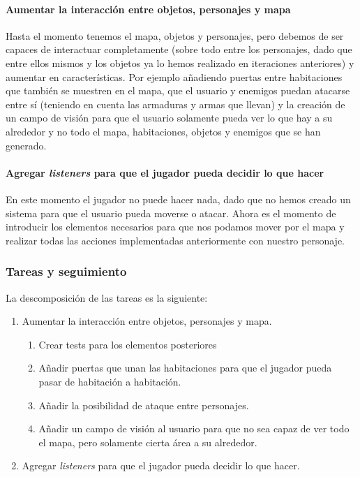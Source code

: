 \paragraph{Aumentar la interacción entre objetos, personajes y mapa} Hasta el momento tenemos el mapa, objetos y personajes, pero debemos de ser capaces de interactuar completamente (sobre todo entre los personajes, dado que entre ellos mismos y los objetos ya lo hemos realizado en iteraciones anteriores) y aumentar en características. Por ejemplo añadiendo puertas entre habitaciones que también se muestren en el mapa, que el usuario y enemigos puedan atacarse entre sí (teniendo en cuenta las armaduras y armas que llevan) y la creación de un campo de visión para que el usuario solamente pueda ver lo que hay a su alrededor y no todo el mapa, habitaciones, objetos y enemigos que se han generado.

\paragraph{Agregar \textit{listeners} para que el jugador pueda decidir lo que hacer} En este momento el jugador no puede hacer nada, dado que no hemos creado un sistema para que el usuario pueda moverse o atacar. Ahora es el momento de introducir los elementos necesarios para que nos podamos mover por el mapa y realizar todas las acciones implementadas anteriormente con nuestro personaje.

\subsubsection{Tareas y seguimiento}

La descomposición de las tareas es la siguiente:

\begin{enumerate}[label=\bfseries WBS 1.\arabic*]
  \item Aumentar la interacción entre objetos, personajes y mapa.
    \begin{enumerate}[label=\bfseries WBS 1.1.\arabic*]
      \item Crear tests para los elementos posteriores
      \item Añadir puertas que unan las habitaciones para que el jugador pueda pasar de habitación a habitación.
      \item Añadir la posibilidad de ataque entre personajes.
      \item Añadir un campo de visión al usuario para que no sea capaz de ver todo el mapa, pero solamente cierta área a su alrededor.
    \end{enumerate}
  \item Agregar \textit{listeners} para que el jugador pueda decidir lo que hacer.
\end{enumerate}

